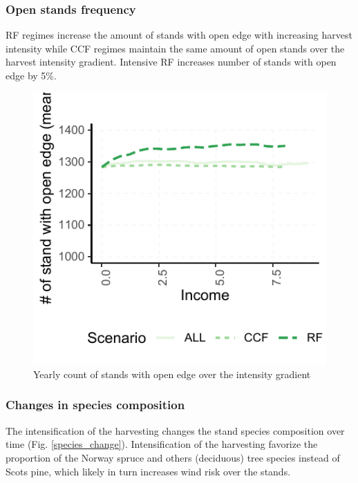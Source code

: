 \documentclass[]{elsarticle} %
\makeatletter
\def\maxwidth{\ifdim\Gin@nat@width>\linewidth\linewidth
\else\Gin@nat@width\fi}
\let\Oldincludegraphics\includegraphics
\renewcommand{\includegraphics}[1]{\Oldincludegraphics[width=\maxwidth]{#1}}
\makeatother
\begin{document}
\subsubsection{Open stands frequency}\label{open-stands-frequency}

RF regimes increase the amount of stands with open edge with increasing
harvest intensity while CCF regimes maintain the same amount of open
stands over the harvest intensity gradient. Intensive RF increases
number of stands with open edge by 5\%.

\begin{figure}
\centering
\includegraphics{test_manus_files/figure-latex/fig_6_count_open_edge-1.pdf}
\caption{Yearly count of stands with open edge over the intensity
gradient}
\end{figure}

\subsubsection{Changes in species
composition}\label{changes-in-species-composition}

The intensification of the harvesting changes the stand species
composition over time (Fig. \ref{species_change}). Intensification of
the harvesting favorize the proportion of the Norway spruce and others
(deciduous) tree species instead of Scots pine, which likely in turn
increases wind risk over the stands.
\end{document}
